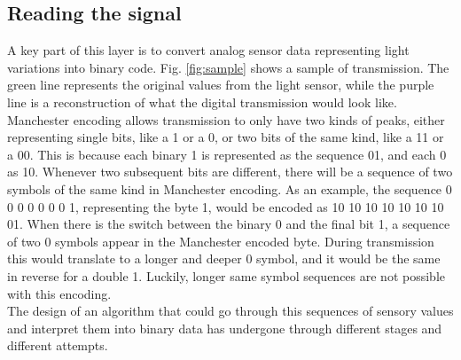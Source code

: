  \subsection{Reading the signal}
A key part of this layer is to convert analog sensor data representing light variations into binary code.
Fig. \ref{fig:sample} shows a sample of transmission. The green line represents the original values from the light sensor, while the purple line is a reconstruction of what the digital transmission would look like. 
Manchester encoding allows transmission to only have two kinds of peaks, either representing single bits, like a 1 or a 0, or two bits of the same kind, like a 11 or a 00.
This is because each binary 1 is represented as the sequence 01, and each 0 as 10.
Whenever two subsequent bits are different, there will be a sequence of two symbols of the same kind in Manchester encoding.
As an example, the sequence 0 0 0 0 0 0 0 1, representing the byte 1, would be encoded as 10 10 10 10 10 10 10 01.
When there is the switch between the binary 0 and the final bit 1, a sequence of two 0 symbols appear in the Manchester encoded byte.
During transmission this would translate to a longer and deeper 0 symbol, and it would be the same in reverse for a double 1.
Luckily, longer same symbol sequences are not possible with this encoding.\\

The design of an algorithm that could go through this sequences of sensory values and interpret them into binary data has undergone through different stages and different attempts.
